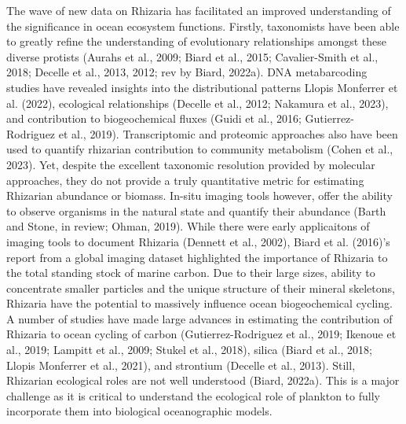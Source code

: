 \documentclass[
]{article}
\begin{document}
The wave of new data on Rhizaria has facilitated an improved
understanding of the significance in ocean ecosystem functions. Firstly,
taxonomists have been able to greatly refine the understanding of
evolutionary relationships amongst these diverse protists (Aurahs et
al., 2009; Biard et al., 2015; Cavalier-Smith et al., 2018; Decelle et
al., 2013, 2012; rev by Biard, 2022a). DNA metabarcoding studies have
revealed insights into the distributional patterns Llopis Monferrer et
al. (2022), ecological relationships (Decelle et al., 2012; Nakamura et
al., 2023), and contribution to biogeochemical fluxes (Guidi et al.,
2016; Gutierrez-Rodriguez et al., 2019). Transcriptomic and proteomic
approaches also have been used to quantify rhizarian contribution to
community metabolism (Cohen et al., 2023). Yet, despite the excellent
taxonomic resolution provided by molecular approaches, they do not
provide a truly quantitative metric for estimating Rhizarian abundance
or biomass. In-situ imaging tools however, offer the ability to observe
organisms in the natural state and quantify their abundance (Barth and
Stone, in review; Ohman, 2019). While there were early applicaitons of
imaging tools to document Rhizaria (Dennett et al., 2002), Biard et al.
(2016)'s report from a global imaging dataset highlighted the importance
of Rhizaria to the total standing stock of marine carbon. Due to their
large sizes, ability to concentrate smaller particles and the unique
structure of their mineral skeletons, Rhizaria have the potential to
massively influence ocean biogeochemical cycling. A number of studies
have made large advances in estimating the contribution of Rhizaria to
ocean cycling of carbon (Gutierrez-Rodriguez et al., 2019; Ikenoue et
al., 2019; Lampitt et al., 2009; Stukel et al., 2018), silica (Biard et
al., 2018; Llopis Monferrer et al., 2021), and strontium (Decelle et
al., 2013). Still, Rhizarian ecological roles are not well understood
(Biard, 2022a). This is a major challenge as it is critical to
understand the ecological role of plankton to fully incorporate them
into biological oceanographic models.
\end{document}
